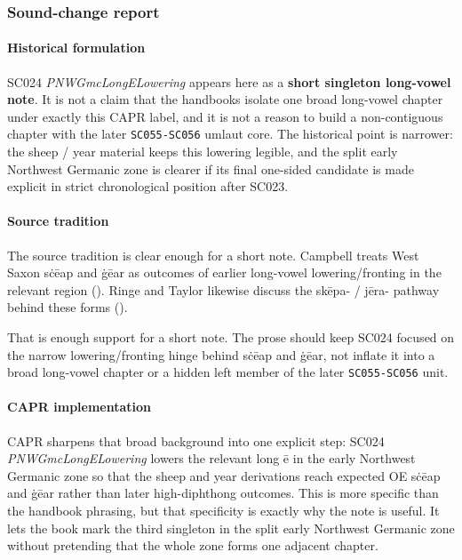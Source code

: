 \documentclass[
  british,
  a4paper,
]{article}
\begin{document}
\subsubsection{Sound-change report}\label{sound-change-report-17}

\paragraph{Historical formulation}\label{historical-formulation-17}

SC024 \emph{PNWGmcLongELowering} appears here as a \textbf{short
singleton long-vowel note}. It is not a claim that the handbooks isolate
one broad long-vowel chapter under exactly this CAPR label, and it is
not a reason to build a non-contiguous chapter with the later
\texttt{SC055-SC056} umlaut core. The historical point is narrower: the
sheep / year material keeps this lowering legible, and the split early
Northwest Germanic zone is clearer if its final one-sided candidate is
made explicit in strict chronological position after SC023.

\paragraph{Source tradition}\label{source-tradition-17}

The source tradition is clear enough for a short note. Campbell treats
West Saxon sċēap and ġēar as outcomes of earlier long-vowel
lowering/fronting in the relevant region
(). Ringe and
Taylor likewise discuss the skēpa- / jēra- pathway behind these forms
().

That is enough support for a short note. The prose should keep SC024
focused on the narrow lowering/fronting hinge behind sċēap and ġēar, not
inflate it into a broad long-vowel chapter or a hidden left member of
the later \texttt{SC055-SC056} unit.

\paragraph{CAPR implementation}\label{capr-implementation-17}

CAPR sharpens that broad background into one explicit step: SC024
\emph{PNWGmcLongELowering} lowers the relevant long ē in the early
Northwest Germanic zone so that the sheep and year derivations reach
expected OE sċēap and ġēar rather than later high-diphthong outcomes.
This is more specific than the handbook phrasing, but that specificity
is exactly why the note is useful. It lets the book mark the third
singleton in the split early Northwest Germanic zone without pretending
that the whole zone forms one adjacent chapter.
\end{document}

